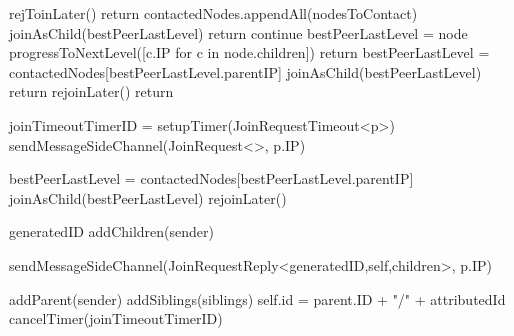 \begin{algorithm}
\begin{algorithmic}[1]

    
             
                \State rejToinLater()
                \State return
            \EndIf
        \EndIf
        \State contactedNodes.appendAll(nodesToContact)
                    \State joinAsChild(bestPeerLastLevel)
                    \State return
                \EndIf
            \EndIf
                \State continue 
            \EndIf
            \State bestPeerLastLevel = node
            \State progressToNextLevel([c.IP for c in node.children])
            \State return
                \State bestPeerLastLevel = contactedNodes[bestPeerLastLevel.parentIP]
                \State joinAsChild(bestPeerLastLevel)       
                \State return
            \Else
                \State rejoinLater()
                \State return
            \EndIf
        \EndFor
    \asdend
   
    \asdprocedure[joinAsChild(p)]
        \State joinTimeoutTimerID = setupTimer(JoinRequestTimeout<p>)
        \State sendMessageSideChannel(JoinRequest<>, p.IP)
    \asdend

    \asdupon[JoinRequestTimeout(p)]
            \State bestPeerLastLevel = contactedNodes[bestPeerLastLevel.parentIP]
            \State joinAsChild(bestPeerLastLevel)
        \Else
            \State rejoinLater()
        \EndIf
    \asdend

        \State generatedID \asdassign addChildren(sender) 

        \State sendMessageSideChannel(JoinRequestReply<generatedID,self,children>, p.IP)
    \asdend
        
        \State addParent(sender) 
        \State addSiblings(siblings) 
        \State self.id = parent.ID + "/" + attributedId
        \State cancelTimer(joinTimeoutTimerID)
    \asdend
\end{algorithmic}
\end{algorithm}
